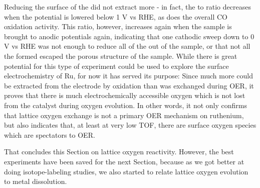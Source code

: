 Reducing the surface of the  did not extract more  - in fact, the  to  ratio decreases when the potential is lowered below 1 V vs RHE, as does the overall CO oxidation activity. This ratio, however, increases again when the sample is brought to anodic potentials again, indicating that one cathodic sweep down to 0 V vs RHE was not enough to reduce all of the  out of the sample, or that not all the  formed escaped the porous structure of the sample. While there is great potential for this type of experiment could be used to explore the surface electrochemistry of Ru, for now it has served its purpose: Since much more  could be extracted from the electrode by  oxidation than was exchanged during OER, it proves that there is much electrochemically accessible oxygen which is not lost from the catalyst during oxygen evolution. In other words, it not only confirms that lattice oxygen exchange is not a primary OER mechanism on ruthenium, but also indicates that, at least at very low TOF, there are surface oxygen species which are spectators to OER.

That concludes this Section on lattice oxygen reactivity. However, the best experiments have been saved for the next Section, because as we got better at doing isotope-labeling studies, we also started to relate lattice oxygen evolution to metal dissolution.




